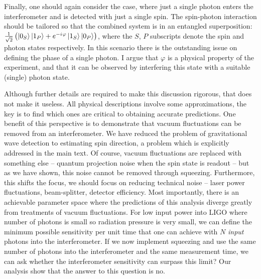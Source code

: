 \documentclass[reqno]{amsart}
\newcommand{\ket}[1]{\left| #1 \right>}
\newcommand{\iu}{{i\mkern1mu}}
\begin{document}
Finally, one should again consider the case, where just a single photon enters the interferometer and is detected with just a single spin. The spin-photon interaction should be tailored so that the combined system is in an entangled superposition: $\frac{1}{\sqrt{2}}\left(\ket{0_S}\ket{1_P}+e^{-\iu \varphi}\ket{1_S}\ket{0_P}\right)$, where the $S$, $P$ subscripts denote the spin and photon states respectively. In this scenario there is the outstanding issue on defining the phase of a single photon. I argue that $\varphi$ is a physical property of the experiment, and that it can be observed by interfering this state with a suitable (single) photon state.

Although further details are required to make this discussion rigorous, that does not make it useless. All physical descriptions involve some approximations, the key is to find which ones are critical to obtaining accurate predictions. One benefit of this perspective is to demonstrate that vacuum fluctuations can be removed from an interferometer. We have reduced the problem of gravitational wave detection to estimating spin direction, a problem which is explicitly addressed in the main text. Of course, vacuum fluctuations are replaced with something else -- quantum projection noise when the spin state is readout -- but as we have shown, this noise cannot be removed through squeezing. Furthermore, this shifts the focus, we should focus on reducing technical noise -- laser power fluctuations, beam-splitter, detector efficiency. Most importantly, there is an achievable parameter space where the predictions of this analysis diverge greatly from treatments of vacuum fluctuations. For low input power into LIGO where number of photons is small so radiation pressure is very small, we can define the minimum possible sensitivity per unit time that one can achieve with $N$ \textit{input} photons into the interferometer. If we now implement squeezing and use the same number of  photons into the interferometer and the same measurement time, we can ask whether the interferometer sensitivity can surpass this limit? Our analysis show that the answer to this question is no.\\
\end{document}
